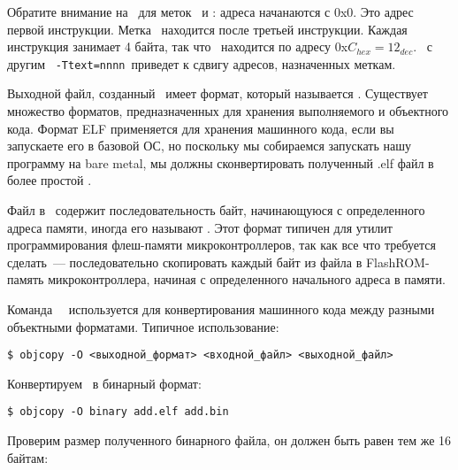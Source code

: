 Обратите внимание на \ для меток
\ и : адреса начанаются с 0x0. Это адрес первой инструкции.
Метка \ находится после третьей инструкции. Каждая инструкция занимает
4 байта, так что \ находится по адресу 0x$C_{hex}=12_{dec}$.
\ с другим \ \verb|-Ttext=nnnn|\ приведет к сдвигу адресов, назначенных меткам.

\bigskip
Выходной файл, созданный \ имеет формат, который называется
. Существует множество форматов, предназначенных для хранения
выполняемого и объектного кода. Формат ELF применяется для хранения
машинного кода, если вы запускаете его в базовой ОС, но поскольку мы собираемся запускать нашу
программу на bare metal, мы должны сконвертировать полученный
.elf файл в более простой .

Файл в \ содержит последовательность байт, начинающуюся с
определенного адреса памяти, иногда его называют . Этот
формат типичен для утилит программирования флеш-памяти микроконтроллеров, так
как все что требуется сделать\ --- последовательно скопировать каждый байт из
файла в FlashROM-память микроконтроллера, начиная с определенного начального
адреса в памяти.

Команда \gnut\ \ используется для конвертирования машинного кода
между разными объектными форматами. Типичное использование:

\begin{verbatim}
$ objcopy -O <выходной_формат> <входной_файл> <выходной_файл>
\end{verbatim}

Конвертируем \ в бинарный формат:

\begin{verbatim}
$ objcopy -O binary add.elf add.bin
\end{verbatim}

Проверим размер полученного бинарного файла, он должен быть равен тем же 16
байтам:

